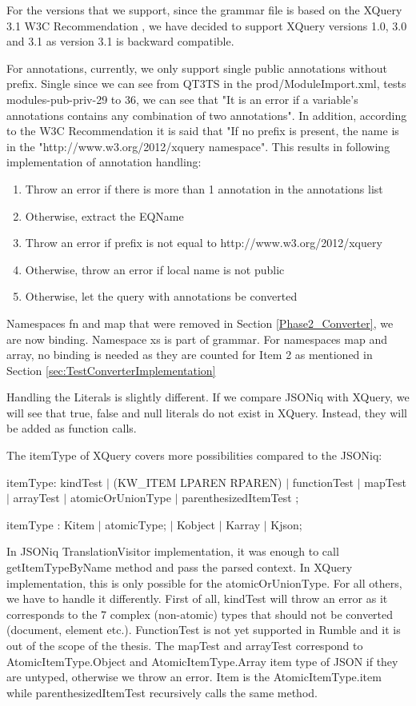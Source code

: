 For the versions that we support, since the grammar file is based on the XQuery 3.1 W3C Recommendation \cite{XQueryRecommendation}, we have decided to support XQuery versions 1.0, 3.0 and 3.1 as version  3.1 is backward compatible.

For annotations, currently, we only support single public annotations without prefix. Single since we can see from QT3TS in the prod/ModuleImport.xml, tests modules-pub-priv-29 to 36, we can see that "It is an error if a variable's annotations contains any combination of two annotations". In addition, according to the W3C Recommendation \cite{XQueryRecommendation} it is said that "If no prefix is present, the name is in the "http://www.w3.org/2012/xquery namespace". This results in following implementation of annotation handling:
\begin{enumerate}
	\item Throw an error if there is more than 1 annotation in the annotations list
	\item Otherwise, extract the EQName
	\item Throw an error if prefix is not equal to http://www.w3.org/2012/xquery 
	\item Otherwise, throw an error if local name is not public
	\item Otherwise, let the query with annotations be converted
\end{enumerate}

Namespaces fn and map that were removed in Section \ref{Phase2_Converter}, we are now binding. Namespace xs is part of grammar. For namespaces map and array, no binding is needed as they are counted for Item 2 as mentioned in Section \ref{sec:TestConverterImplementation}

Handling the Literals is slightly different. If we compare JSONiq with XQuery, we will see that true, false and null literals do not exist in XQuery. Instead, they will be added as function calls.

The itemType of XQuery covers more possibilities compared to the JSONiq:

itemType: kindTest
$|$ (KW\_ITEM LPAREN RPAREN)
$|$ functionTest
$|$ mapTest
$|$ arrayTest
$|$ atomicOrUnionType
$|$ parenthesizedItemTest ;

itemType                : Kitem
$|$ atomicType;
$|$ Kobject
$|$ Karray
$|$ Kjson;

In JSONiq TranslationVisitor implementation, it was enough to call getItemTypeByName method and pass the parsed context. In XQuery implementation, this is only possible for the atomicOrUnionType. For all others, we have to handle it differently. First of all, kindTest will throw an error as it corresponds to the 7 complex (non-atomic) types that should not be converted (document, element etc.). FunctionTest is not yet supported in Rumble and it is out of the scope of the thesis. The mapTest and arrayTest correspond to AtomicItemType.Object and AtomicItemType.Array item type of JSON if they are untyped, otherwise we throw an error. Item is the AtomicItemType.item while parenthesizedItemTest recursively calls the same method.

